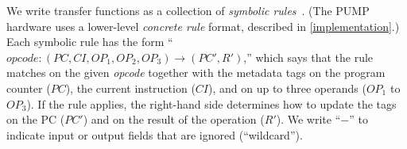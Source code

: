 We write transfer functions as a collection of {\em
  symbolic rules}~\cite{popl2015, pump_hasp2014}.
%
(The PUMP hardware uses a lower-level {\em concrete rule} format, 
described in \autoref{implementation}.)
%
Each symbolic rule has the form
%
%
\newcommand{\INLINERULE}[8]{\mathit{#1}
\mathrel{:}\allowbreak
 ({\mathit{#2}},\allowbreak{\mathit{#3}},\allowbreak{\mathit{#4}},\allowbreak{\mathit{#5}},\allowbreak{\mathit{#6}})
 \rightarrow\allowbreak ({\mathit{#7}},\allowbreak{\mathit{#8}})
}%
``$\INLINERULE{opcode}{PC}{CI}{OP_1}{OP_2}{OP_3}{PC'}{R'}$,''
%
which says that the rule matches on the given {\it opcode} together
with the metadata tags on the program counter ($\mathit{PC}$), the
current instruction ($\mathit{CI}$), and on up to three operands
($\mathit{OP_1}$ to $\mathit{OP_3}$).
%
%
If the rule applies, the right-hand side determines how to update the
tags on the PC ($\mathit{PC'}$) and on the result of the operation
($\mathit{R'}$).
%
We write ``$-$'' to indicate input or output fields that are ignored
(``wildcard'').
%
%
%

